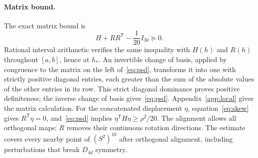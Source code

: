 \documentclass[11pt]{article}
\begin{document}
\paragraph{Matrix bound.}
The exact matrix bound is
\begin{equation}
 H+RR^{\mathsf T}-\frac1{20}I_{30}\succeq0.\label{eq:psd}
\end{equation}
Rational interval arithmetic verifies the same inequality with $H(h)$
and $R(h)$ throughout $[a,b]$, hence at $h_*$.
An invertible change of basis, applied by congruence to the matrix on
the left of~\eqref{eq:psd}, transforms it into one with
strictly positive diagonal entries, each greater than the sum of the
absolute values of the other entries in its row. This strict diagonal
dominance proves positive definiteness; the inverse change of basis
gives~\eqref{eq:psd}. Appendix~\ref{app:local} gives the
matrix calculation.
For the concatenated displacement $\eta$, equation~\eqref{eq:skew} gives
$R^{\mathsf T}\eta=0$, and~\eqref{eq:psd} implies
$\eta^{\mathsf T}H\eta\geq\rho^2/20$. The alignment allows all orthogonal
maps; $R$ removes their continuous rotation directions. The estimate
covers every nearby point of $(S^2)^{10}$ after orthogonal alignment,
including perturbations that break $D_{4d}$ symmetry.
\end{document}
